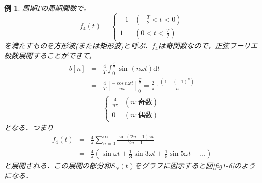 \documentclass[a4j]{jsbook}
\newtheorem{example}[theorem]{例}
\numberwithin{theorem}{chapter}  %
\begin{document}
\begin{example}
\label{ex1-4}
周期\(T\)の周期関数で，
\begin{equation*}
    f_4(t) = \begin{cases}
    -1 & \left(-\frac{T}{2}<t<0\right) \\
    1 & \left(0<t<\frac{T}{2}\right)
    \end{cases}
\end{equation*}
を満たすものを方形波(または矩形波)と呼ぶ．\(f_4\)は奇関数なので，正弦フーリエ級数展開することができて，
\begin{eqnarray*}
b[n]&=&\frac{4}{T}\int_0^\frac{T}{2} \sin(n\omega t)\mathrm{d}t \\
&=&\frac{4}{T}\left[\frac{-\cos n\omega t}{n\omega}\right]_0^\frac{T}{2}=\frac{2}{\pi}\cdot\frac{(1-(-1)^n)}{n} \\
&=&\begin{cases}
\frac{4}{n\pi} & (n:\mbox{奇数}) \\
0 & (n:\mbox{偶数})
\end{cases}
\end{eqnarray*}
となる．つまり
\begin{eqnarray*}
f_4(t)&=&\frac{4}{\pi}\sum_{n=0}^\infty\frac{\sin(2n+1)\omega t}{2n+1} \\
&=&\frac{4}{\pi}\left(\sin\omega t+\frac{1}{3}\sin 3\omega t+\frac{1}{5}\sin 5\omega t+\dots\right)
\end{eqnarray*}
と展開される．この展開の部分和\(S_N(t)\)をグラフに図示すると図\ref{fig1-6}のようになる．
\begin{figure}[htbp]
    \centering

\end{figure}
\end{example}
\end{document}
